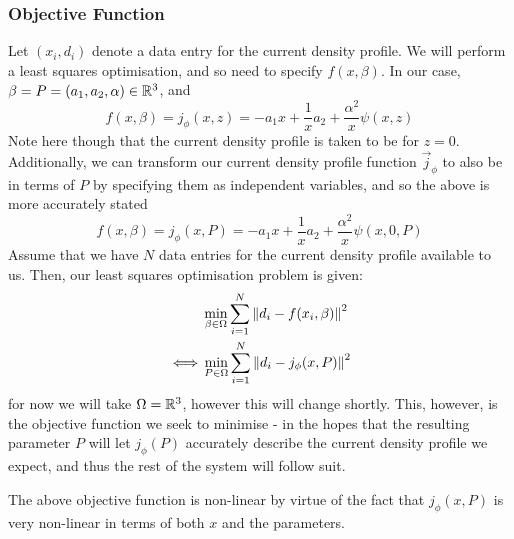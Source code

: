 \subsubsection{Objective Function}
Let $(x_i, d_i)$ denote a data entry for the current density profile. We will perform a least squares optimisation, and so need to specify $f(x, \beta)$. 
In our case, $\beta = P = (a_1, a_2, \alpha) \in \mathbb{R}^3$, and
\begin{equation*}
    f(x, \beta) = j_{\phi}(x, z) = -a_1 x + \frac{1}{x} a_2 + \frac{\alpha^2}{x} \psi(x, z)
\end{equation*}
Note here though that the current density profile is taken to be for $z = 0$. Additionally, we can transform our current density profile function 
$\vec{j}_{\phi}$ to also be in terms of $P$ by specifying them as independent variables, and so the above is more accurately stated
\begin{equation*}
    f(x, \beta) = j_{\phi}(x, P) = -a_1 x + \frac{1}{x} a_2 + \frac{\alpha^2}{x} \psi(x, 0, P)
\end{equation*}
Assume that we have $N$ data entries for the current density profile available to us. Then, our least squares optimisation problem is given:
\begin{align*}
    \notag& \min_{\beta \in \Omega} \sum_{i = 1}^{N} \norm{d_i - f(x_i, \beta)}^2 \\
    \iff& \min_{P \in \Omega} \sum_{i = 1}^{N} \norm{d_i - j_{\phi}(x, P)}^2 
\end{align*}
for now we will take $\Omega = \mathbb{R}^3$, however this will change shortly. This, however, is the objective function we seek to minimise - 
in the hopes that the resulting parameter $P$ will let $j_{\phi}(P)$ accurately describe the current density profile we expect, and thus 
the rest of the system will follow suit.

\begin{remark}
    The above objective function is non-linear by virtue of the fact that $j_{\phi}(x, P)$ is very non-linear in terms of 
    both $x$ and the parameters.
\end{remark}
\newpage
